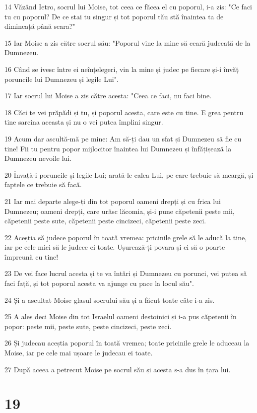 \par 14 Văzând Ietro, socrul lui Moise, tot ceea ce făcea el cu poporul, i-a zis: "Ce faci tu cu poporul? De ce stai tu singur și tot poporul tău stă înaintea ta de dimineață până seara?"
\par 15 Iar Moise a zis către socrul său: "Poporul vine la mine să ceară judecată de la Dumnezeu.
\par 16 Când se ivesc între ei neînțelegeri, vin la mine și judec pe fiecare și-i învăț poruncile lui Dumnezeu și legile Lui".
\par 17 Iar socrul lui Moise a zis către acesta: "Ceea ce faci, nu faci bine.
\par 18 Căci te vei prăpădi și tu, și poporul acesta, care este cu tine. E grea pentru tine sarcina aceasta și nu o vei putea împlini singur.
\par 19 Acum dar ascultă-mă pe mine: Am să-ți dau un sfat și Dumnezeu să fie cu tine! Fii tu pentru popor mijlocitor înaintea lui Dumnezeu și înfățișează la Dumnezeu nevoile lui.
\par 20 Învață-i poruncile și legile Lui; arată-le calea Lui, pe care trebuie să meargă, și faptele ce trebuie să facă.
\par 21 Iar mai departe alege-ți din tot poporul oameni drepți și cu frica lui Dumnezeu; oameni drepți, care urăsc lăcomia, și-i pune căpetenii peste mii, căpetenii peste sute, căpetenii peste cincizeci, căpetenii peste zeci.
\par 22 Aceștia să judece poporul în toată vremea: pricinile grele să le aducă la tine, iar pe cele mici să le judece ei toate. Ușurează-ți povara și ei să o poarte împreună cu tine!
\par 23 De vei face lucrul acesta și te va întări și Dumnezeu cu porunci, vei putea să faci față, și tot poporul acesta va ajunge cu pace la locul său".
\par 24 Și a ascultat Moise glasul socrului său și a făcut toate câte i-a zis.
\par 25 A ales deci Moise din tot Israelul oameni destoinici și i-a pus căpetenii în popor: peste mii, peste sute, peste cincizeci, peste zeci.
\par 26 Și judecau aceștia poporul în toată vremea; toate pricinile grele le aduceau la Moise, iar pe cele mai ușoare le judecau ei toate.
\par 27 După aceea a petrecut Moise pe socrul său și acesta s-a dus în țara lui.

\chapter{19}


